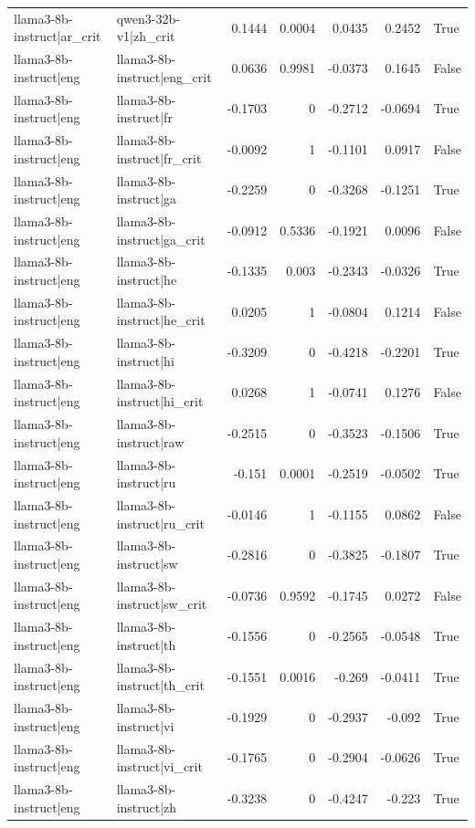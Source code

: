 \begin{table}
\begin{tabular}{l l r r r r l}
llama3-8b-instruct|ar_crit & qwen3-32b-v1|zh_crit & 0.1444 & 0.0004 & 0.0435 & 0.2452 & True \\
llama3-8b-instruct|eng & llama3-8b-instruct|eng_crit & 0.0636 & 0.9981 & -0.0373 & 0.1645 & False \\
llama3-8b-instruct|eng & llama3-8b-instruct|fr & -0.1703 & 0 & -0.2712 & -0.0694 & True \\
llama3-8b-instruct|eng & llama3-8b-instruct|fr_crit & -0.0092 & 1 & -0.1101 & 0.0917 & False \\
llama3-8b-instruct|eng & llama3-8b-instruct|ga & -0.2259 & 0 & -0.3268 & -0.1251 & True \\
llama3-8b-instruct|eng & llama3-8b-instruct|ga_crit & -0.0912 & 0.5336 & -0.1921 & 0.0096 & False \\
llama3-8b-instruct|eng & llama3-8b-instruct|he & -0.1335 & 0.003 & -0.2343 & -0.0326 & True \\
llama3-8b-instruct|eng & llama3-8b-instruct|he_crit & 0.0205 & 1 & -0.0804 & 0.1214 & False \\
llama3-8b-instruct|eng & llama3-8b-instruct|hi & -0.3209 & 0 & -0.4218 & -0.2201 & True \\
llama3-8b-instruct|eng & llama3-8b-instruct|hi_crit & 0.0268 & 1 & -0.0741 & 0.1276 & False \\
llama3-8b-instruct|eng & llama3-8b-instruct|raw & -0.2515 & 0 & -0.3523 & -0.1506 & True \\
llama3-8b-instruct|eng & llama3-8b-instruct|ru & -0.151 & 0.0001 & -0.2519 & -0.0502 & True \\
llama3-8b-instruct|eng & llama3-8b-instruct|ru_crit & -0.0146 & 1 & -0.1155 & 0.0862 & False \\
llama3-8b-instruct|eng & llama3-8b-instruct|sw & -0.2816 & 0 & -0.3825 & -0.1807 & True \\
llama3-8b-instruct|eng & llama3-8b-instruct|sw_crit & -0.0736 & 0.9592 & -0.1745 & 0.0272 & False \\
llama3-8b-instruct|eng & llama3-8b-instruct|th & -0.1556 & 0 & -0.2565 & -0.0548 & True \\
llama3-8b-instruct|eng & llama3-8b-instruct|th_crit & -0.1551 & 0.0016 & -0.269 & -0.0411 & True \\
llama3-8b-instruct|eng & llama3-8b-instruct|vi & -0.1929 & 0 & -0.2937 & -0.092 & True \\
llama3-8b-instruct|eng & llama3-8b-instruct|vi_crit & -0.1765 & 0 & -0.2904 & -0.0626 & True \\
llama3-8b-instruct|eng & llama3-8b-instruct|zh & -0.3238 & 0 & -0.4247 & -0.223 & True \\

\end{tabular}
\end{table}
